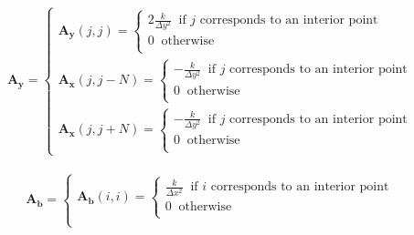 \documentclass[12 pt, final]{article}
\begin{document}
\begin{itemize}
\begin{itemize}
            \begin{align*}
                    \mathbf{A_y} = \begin{cases}
                    \mathbf{A_y}(j,j) =
                    \begin{cases}
                    2\frac{k}{\Delta y^2} \: \text{ if $j$ corresponds to an interior point}\:\\
                    0 \: \text{ otherwise}\:\\
                    \end{cases}\\
                    \mathbf{A_x}(j,j-N) =
                    \begin{cases}
                    -\frac{k}{\Delta y^2} \: \text{ if $j$ corresponds to an interior point}\:\\
                    0 \: \text{ otherwise}\:\\
                    \end{cases}\\
                    \mathbf{A_x}(j,j+N) =
                    \begin{cases}
                    -\frac{k}{\Delta y^2} \: \text{ if $j$ corresponds to an interior point}\:\\
                    0 \: \text{ otherwise}\:\\
                    \end{cases}
                    \end{cases}
            \end{align*}

            \begin{align*}
                    \mathbf{A_b} = \begin{cases}
                    \mathbf{A_b}(i,i) =
                    \begin{cases}
                    \frac{k}{\Delta x^2} \: \text{ if $i$ corresponds to an interior point}\:\\
                    0 \: \text{ otherwise}\:\\
                    \end{cases}\\
                    \end{cases}
            \end{align*}
 

\end{itemize}
\end{itemize}
\end{document}
